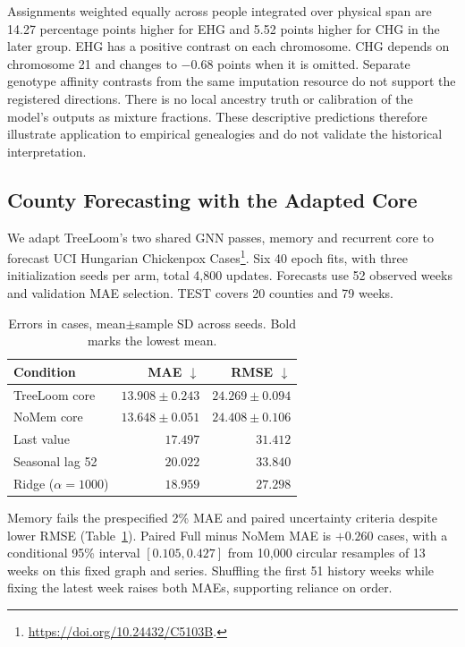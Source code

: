 \documentclass[letterpaper]{article}
\newcommand{\best}[1]{\mathbf{#1}}
\begin{document}
Assignments weighted equally across people integrated over physical span are 14.27 percentage points higher for EHG and 5.52 points higher for CHG in the later group. EHG has a positive contrast on each chromosome. CHG depends on chromosome 21 and changes to $-0.68$ points when it is omitted. Separate genotype affinity contrasts from the same imputation resource do not support the registered directions. There is no local ancestry truth or calibration of the model's outputs as mixture fractions. These descriptive predictions therefore illustrate application to empirical genealogies and do not validate the historical interpretation.

\subsection{County Forecasting with the Adapted Core}
\label{app:countyforecasting}
We adapt TreeLoom's two shared GNN passes, memory and recurrent core to forecast UCI Hungarian Chickenpox Cases\footnote{\url{https://doi.org/10.24432/C5103B}.}. Six 40 epoch fits, with three initialization seeds per arm, total 4,800 updates. Forecasts use 52 observed weeks and validation MAE selection. TEST covers 20 counties and 79 weeks.

\begin{table}[!htbp]
\centering
\small
\begin{tabular}{@{}lrr@{}}
\toprule
Condition & MAE $\downarrow$ & RMSE $\downarrow$\\
\midrule
TreeLoom core &$13.908\pm0.243$&$\best{24.269\pm0.094}$\\
NoMem core &$\best{13.648\pm0.051}$&$24.408\pm0.106$\\
Last value &$17.497$&$31.412$\\
Seasonal lag 52 &$20.022$&$33.840$\\
Ridge ($\alpha=1000$) &$18.959$&$27.298$\\
\bottomrule
\end{tabular}
\caption{Errors in cases, mean$\pm$sample SD across seeds. Bold marks the lowest mean.}
\label{tab:countyforecasting}
\end{table}

Memory fails the prespecified 2\% MAE and paired uncertainty criteria despite lower RMSE (Table~\ref{tab:countyforecasting}). Paired Full minus NoMem MAE is $+0.260$ cases, with a conditional 95\% interval $[0.105,0.427]$ from 10,000 circular resamples of 13 weeks on this fixed graph and series. Shuffling the first 51 history weeks while fixing the latest week raises both MAEs, supporting reliance on order.
\end{document}
